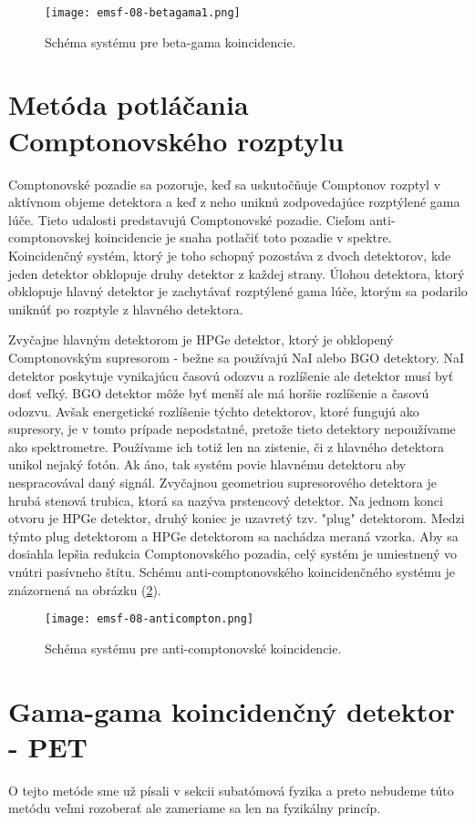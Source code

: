 \documentclass[../../main.tex]{subfiles}
\begin{document}
\begin{figure}[!h]
\texttt{[image: emsf-08-betagama1.png]}
\centering
\caption{Schéma systému pre beta-gama koincidencie.}
\label{em8:fig:betagama1}
\end{figure}

\section{Metóda potláčania Comptonovského rozptylu}
Comptonovské pozadie sa pozoruje, keď sa uskutočňuje Comptonov rozptyl v aktívnom objeme detektora a keď z neho uniknú zodpovedajúce rozptýlené gama lúče. Tieto udalosti predstavujú Comptonovské pozadie. Cieľom anti-comptonovskej koincidencie je snaha potlačiť toto pozadie v spektre. Koincidenčný systém, ktorý je toho schopný pozostáva z dvoch detektorov, kde jeden detektor obklopuje druhy detektor z každej strany. Úlohou detektora, ktorý obklopuje hlavný detektor je zachytávať rozptýlené gama lúče, ktorým sa podarilo uniknúť po rozptyle z hlavného detektora. 

Zvyčajne hlavným detektorom je HPGe detektor, ktorý je obklopený Comptonovským supresorom - bežne sa používajú NaI alebo BGO detektory. NaI detektor poskytuje vynikajúcu časovú odozvu a rozlíšenie ale detektor musí byť dosť veľký. BGO detektor môže byť menší ale má horšie rozlíšenie a časovú odozvu. Avšak energetické rozlíšenie týchto detektorov, ktoré fungujú ako supresory, je v tomto prípade nepodstatné, pretože tieto detektory nepoužívame ako spektrometre. Používame ich totiž len na zistenie, či z hlavného detektora unikol nejaký fotón. Ak áno, tak systém povie hlavnému detektoru aby nespracovával daný signál. Zvyčajnou geometriou supresorového detektora je hrubá stenová trubica, ktorá sa nazýva prstencový detektor. Na jednom konci otvoru je HPGe detektor, druhý koniec je uzavretý tzv. "plug" detektorom. Medzi týmto plug detektorom a HPGe detektorom sa nachádza meraná vzorka. Aby sa dosiahla lepšia redukcia Comptonovského pozadia, celý systém je umiestnený vo vnútri pasívneho štítu. Schému anti-comptonovského koincidenčného systému je znázornená na obrázku (\ref{em8:fig:anticomton}).

\begin{figure}[!h]
\texttt{[image: emsf-08-anticompton.png]}
\centering
\caption{Schéma systému pre anti-comptonovské koincidencie.}
\label{em8:fig:anticomton}
\end{figure}

\section{Gama-gama koincidenčný detektor - PET}
O tejto metóde sme už písali v sekcii subatómová fyzika a preto nebudeme túto metódu veľmi rozoberať ale zameriame sa len na fyzikálny princíp.
\end{document}
